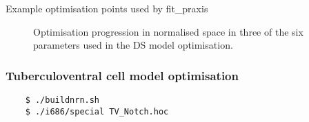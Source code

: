 Example optimisation points used by \textsf{fit\_praxis}
\begin{figure}[htb]
  \centering
  \caption{Optimisation progression in normalised space in three of the six
    parameters used in the DS model optimisation.} \label{fig:praxis}
\end{figure}


\newpage
%



\subsubsection[TV cell model]{Tuberculoventral cell model
  optimisation}\label{sec:APDX:tuberc-cell-model}

\begin{verbatim}
    $ ./buildnrn.sh
    $ ./i686/special TV_Notch.hoc
\end{verbatim}


